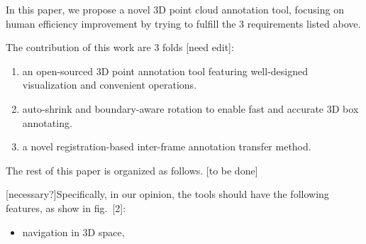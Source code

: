\documentclass[letterpaper, 10 pt, conference]{ieeeconf}  %
\begin{document}
In this paper, we propose a novel 3D point cloud annotation tool, focusing on human efficiency improvement by trying to fulfill the 3 requirements listed above. 

The  contribution of this work are 3 folds [need edit]:
\begin{enumerate}
	\item an open-sourced 3D point annotation tool featuring  well-designed visualization and convenient operations.
	\item auto-shrink and boundary-aware rotation to enable fast and accurate 3D box annotating.
	\item a novel registration-based inter-frame annotation transfer method.
\end{enumerate}


The rest of this paper is organized as follows. [to be done]

[necessary?]Specifically, in our opinion, the tools should have the following features, as show in fig.~[2]:
\begin{itemize}
	\item navigation in 3D space, 
\end{itemize}
\end{document}
